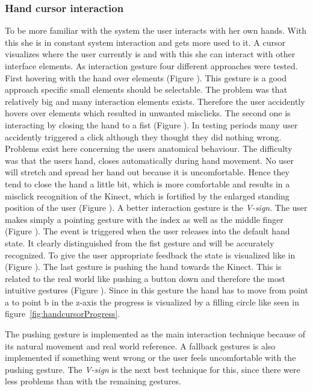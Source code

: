 \subsubsection{Hand cursor interaction}
To be more familiar with the system the user interacts with her own hands. With this she is in constant system interaction and gets more used to it. A cursor visualizes where the user currently is and with this she can interact with other interface elements. As interaction gesture four different approaches were tested. First hovering with the hand over elements (Figure ). This gesture is a good approach specific small elements should be selectable. The problem was that relatively big and many interaction elements exists. Therefore the user accidently hovers over elements which resulted in unwanted misclicks. 
The second one is interacting by closing the hand to a fist (Figure ). In testing periods many user accidently triggered a click although they thought they did nothing wrong. Problems exist here concerning the users anatomical behaviour. The difficulty was that the users hand, closes automatically during hand movement. No user will stretch and spread her hand out because it is uncomfortable. Hence they tend to close the hand a little bit, which is more comfortable and results in a misclick recognition of the Kinect, which is fortified by the enlarged standing position of the user (Figure ).
A better interaction gesture is the \textit{V-sign}. The user makes simply a pointing gesture with the index as well as the middle finger (Figure ). The event is triggered when the user releases into the default hand state. It clearly distinguished from the fist gesture and will be accurately recognized. To give the user appropriate feedback the state is visualized like in (Figure ).
The last gesture is pushing the hand towards the Kinect. This is related to the real world like pushing a button down and therefore the most intuitive gestures (Figure ). 
Since in this gesture the hand has to move from point a to point b in the z-axis the progress is visualized by a filling circle like seen in figure~\ref{fig:handcursorProgress}.

The pushing gesture is implemented as the main interaction technique because of its natural movement and real world 
reference. A fallback gestures is also implemented if something went wrong or the user feels uncomfortable with the pushing gesture. The \textit{V-sign} is the next best technique for this, since there were less problems than with the remaining gestures.

